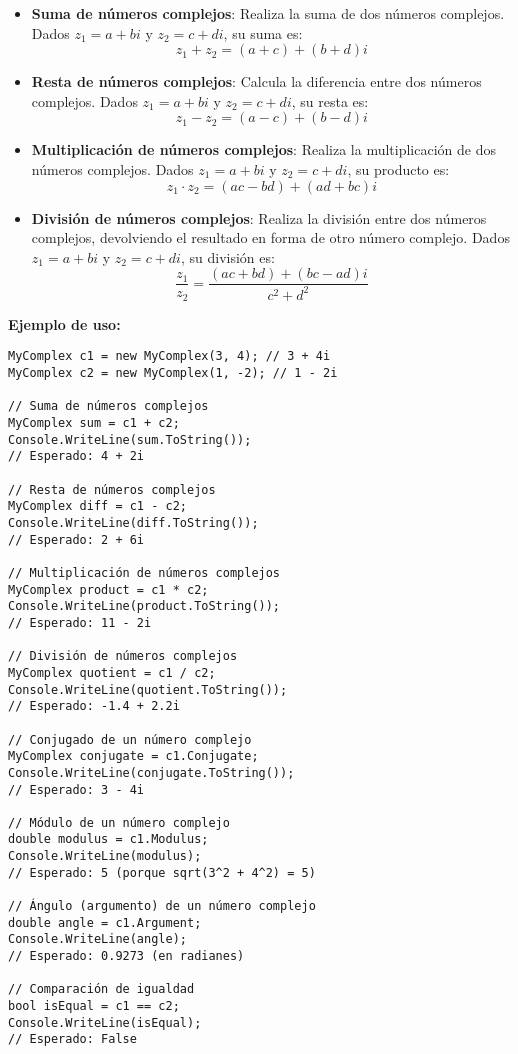 \begin{itemize}
    \item \textbf{Suma de números complejos}: Realiza la suma de dos números complejos. Dados $z_1 = a + bi$ y $z_2 = c + di$, su suma es:
    \[
    z_1 + z_2 = (a + c) + (b + d)i
    \]
    \item \textbf{Resta de números complejos}: Calcula la diferencia entre dos números complejos. Dados $z_1 = a + bi$ y $z_2 = c + di$, su resta es:
    \[
    z_1 - z_2 = (a - c) + (b - d)i
    \]
    \item \textbf{Multiplicación de números complejos}: Realiza la multiplicación de dos números complejos. Dados $z_1 = a + bi$ y $z_2 = c + di$, su producto es:
    \[
    z_1 \cdot z_2 = (ac - bd) + (ad + bc)i
    \]
    \item \textbf{División de números complejos}: Realiza la división entre dos números complejos, devolviendo el resultado en forma de otro número complejo. Dados $z_1 = a + bi$ y $z_2 = c + di$, su división es:
    \[
    \frac{z_1}{z_2} = \frac{(ac + bd) + (bc - ad)i}{c^2 + d^2}
    \]
\end{itemize}

\textbf{Ejemplo de uso:}
\begin{lstlisting}
MyComplex c1 = new MyComplex(3, 4); // 3 + 4i
MyComplex c2 = new MyComplex(1, -2); // 1 - 2i

// Suma de números complejos
MyComplex sum = c1 + c2;
Console.WriteLine(sum.ToString());
// Esperado: 4 + 2i

// Resta de números complejos
MyComplex diff = c1 - c2;
Console.WriteLine(diff.ToString());
// Esperado: 2 + 6i

// Multiplicación de números complejos
MyComplex product = c1 * c2;
Console.WriteLine(product.ToString());
// Esperado: 11 - 2i

// División de números complejos
MyComplex quotient = c1 / c2;
Console.WriteLine(quotient.ToString());
// Esperado: -1.4 + 2.2i

// Conjugado de un número complejo
MyComplex conjugate = c1.Conjugate;
Console.WriteLine(conjugate.ToString());
// Esperado: 3 - 4i

// Módulo de un número complejo
double modulus = c1.Modulus;
Console.WriteLine(modulus);
// Esperado: 5 (porque sqrt(3^2 + 4^2) = 5)

// Ángulo (argumento) de un número complejo
double angle = c1.Argument;
Console.WriteLine(angle);
// Esperado: 0.9273 (en radianes)

// Comparación de igualdad
bool isEqual = c1 == c2;
Console.WriteLine(isEqual);
// Esperado: False
\end{lstlisting}
